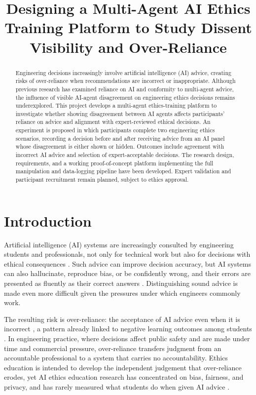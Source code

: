 \documentclass[conference]{IEEEtran}
\title{Designing a Multi-Agent AI Ethics Training Platform to Study Dissent Visibility and Over-Reliance}
\author{
  \IEEEauthorblockN{Aryan Cyrus and Ubaid Irfan}
  \IEEEauthorblockA{Monash Faculty of Information Technology}
}
\begin{document}
\maketitle

\begin{abstract}
Engineering decisions increasingly involve artificial intelligence (AI) advice, creating risks of over-reliance when recommendations are incorrect or inappropriate. Although previous research has examined reliance on AI and conformity to multi-agent advice, the influence of visible AI-agent disagreement on engineering ethics decisions remains underexplored. This project develops a multi-agent ethics-training platform to investigate whether showing disagreement between AI agents affects participants' reliance on advice and alignment with expert-reviewed ethical decisions. An experiment is proposed in which participants complete two engineering ethics scenarios, recording a decision before and after receiving advice from an AI panel whose disagreement is either shown or hidden. Outcomes include agreement with incorrect AI advice and selection of expert-acceptable decisions. The research design, requirements, and a working proof-of-concept platform implementing the full manipulation and data-logging pipeline have been developed. Expert validation and participant recruitment remain planned, subject to ethics approval.\end{abstract}

\section{Introduction}
Artificial intelligence (AI) systems are increasingly consulted by engineering students and professionals, not only for technical work but also for decisions with ethical consequences \cite{landes2026defermoraladvice}. Such advice can improve decision accuracy, but AI systems can also hallucinate, reproduce bias, or be confidently wrong, and their errors are presented as fluently as their correct answers \cite{ji2023hallucination}. Distinguishing sound advice is made even more difficult given the pressures under which engineers commonly work.

The resulting risk is over-reliance: the acceptance of AI advice even when it is incorrect \cite{bucinca2021trustorthink}, a pattern already linked to negative learning outcomes among students \cite{abubakar2025overreliance}. In engineering practice, where decisions affect public safety and are made under time and commercial pressure, over-reliance transfers judgment from an accountable professional to a system that carries no accountability. Ethics education is intended to develop the independent judgement that over-reliance erodes, yet AI ethics education research has concentrated on bias, fairness, and privacy, and has rarely measured what students do when given AI advice \cite{hillis2026aiethics}.
\end{document}
